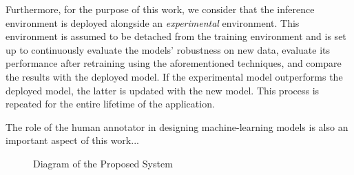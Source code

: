 \documentclass[../main.tex]{subfiles}
\begin{document}
    Furthermore, for the purpose of this work, we consider that the inference environment is deployed alongside an \textit{experimental} environment. This environment is assumed to be detached from the training environment and is set up to continuously evaluate the models' robustness on new data, evaluate its performance after retraining using the aforementioned techniques, and compare the results with the deployed model. If the experimental model outperforms the deployed model, the latter is updated with the new model. This process is repeated for the entire lifetime of the application.


    The role of the human annotator in designing machine-learning models is also an important aspect of this work...

    \begin{figure}[t]
        \centering
        \caption{Diagram of the Proposed System}
        \hspace*{-0.5cm}
        \label{fig:system_proposal_diagram}
    \end{figure}

        
  
\end{document}
